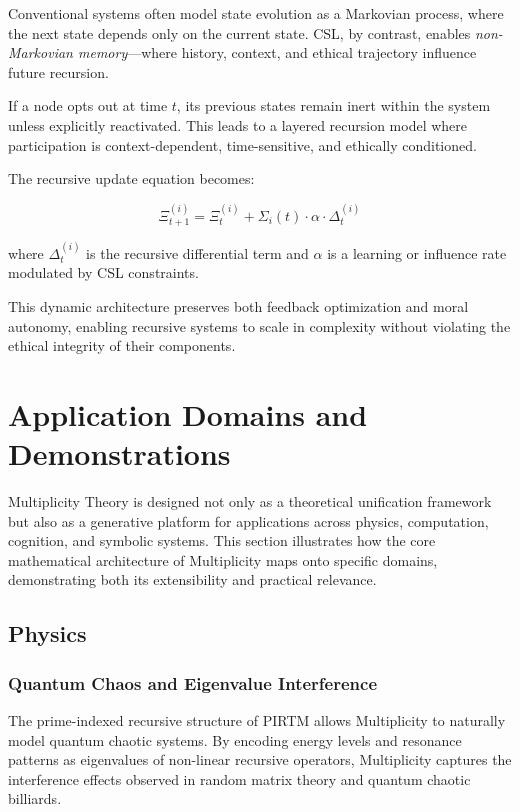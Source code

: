 \documentclass{article}
\theoremstyle{plain}
\begin{document}
Conventional systems often model state evolution as a Markovian process, where the next state depends only on the current state. CSL, by contrast, enables \textit{non-Markovian memory}—where history, context, and ethical trajectory influence future recursion.

If a node opts out at time \( t \), its previous states remain inert within the system unless explicitly reactivated. This leads to a layered recursion model where participation is context-dependent, time-sensitive, and ethically conditioned.

The recursive update equation becomes:

\[
\Xi_{t+1}^{(i)} = \Xi_t^{(i)} + \Sigma_i(t) \cdot \alpha \cdot \Delta_t^{(i)}
\]

where \( \Delta_t^{(i)} \) is the recursive differential term and \( \alpha \) is a learning or influence rate modulated by CSL constraints.

This dynamic architecture preserves both feedback optimization and moral autonomy, enabling recursive systems to scale in complexity without violating the ethical integrity of their components.
\section{Application Domains and Demonstrations}

Multiplicity Theory is designed not only as a theoretical unification framework but also as a generative platform for applications across physics, computation, cognition, and symbolic systems. This section illustrates how the core mathematical architecture of Multiplicity maps onto specific domains, demonstrating both its extensibility and practical relevance.

\subsection{Physics}

\subsubsection{Quantum Chaos and Eigenvalue Interference}

The prime-indexed recursive structure of PIRTM allows Multiplicity to naturally model quantum chaotic systems. By encoding energy levels and resonance patterns as eigenvalues of non-linear recursive operators, Multiplicity captures the interference effects observed in random matrix theory and quantum chaotic billiards.
\end{document}
